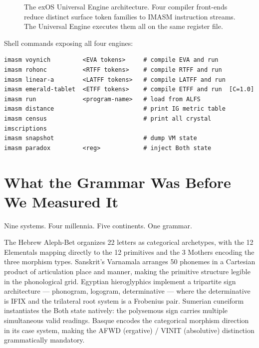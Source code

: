 \documentclass[12pt,a4paper]{article}
\begin{document}
\begin{figure}[htbp]
\caption{The exOS Universal Engine architecture. Four compiler front-ends reduce distinct surface token families to IMASM instruction streams. The Universal Engine executes them all on the same register file.}
\label{fig:exos}
\end{figure}

Shell commands exposing all four engines:

\begin{lstlisting}[language={}]
imasm voynich         <EVA tokens>     # compile EVA and run
imasm rohonc          <RTFF tokens>    # compile RTFF and run
imasm linear-a        <LATFF tokens>   # compile LATFF and run
imasm emerald-tablet  <ETFF tokens>    # compile ETFF and run  [C=1.0]
imasm run             <program-name>   # load from ALFS
imasm distance                         # print IG metric table
imasm census                           # print all crystal imscriptions
imasm snapshot                         # dump VM state
imasm paradox         <reg>            # inject Both state
\end{lstlisting}

\section{What the Grammar Was Before We Measured It}
\label{sec:conclusion}

Nine systems. Four millennia. Five continents. One grammar.

The Hebrew Aleph-Bet organizes 22 letters as categorical archetypes, with the 12 Elementals mapping directly to the 12 primitives and the 3 Mothers encoding the three morphism types. Sanskrit's Varnamala arranges 50 phonemes in a Cartesian product of articulation place and manner, making the primitive structure legible in the phonological grid. Egyptian hieroglyphics implement a tripartite sign architecture --- phonogram, logogram, determinative --- where the determinative is IFIX and the trilateral root system is a Frobenius pair. Sumerian cuneiform instantiates the Both state natively: the polysemous sign carries multiple simultaneous valid readings. Basque encodes the categorical morphism direction in its case system, making the AFWD (ergative) / VINIT (absolutive) distinction grammatically mandatory.
\end{document}

